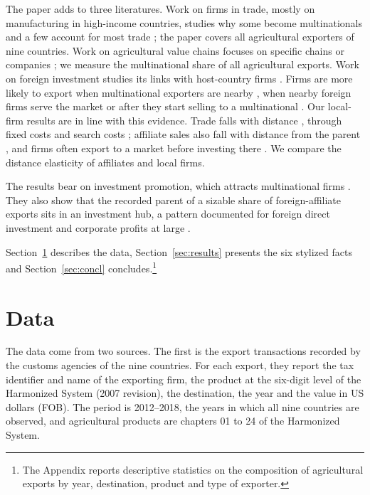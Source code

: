 The paper adds to three literatures. Work on firms in trade, mostly on manufacturing in high-income countries,
studies why some become multinationals and a few account for most trade \citep[see, e.g.,][]{helpman2004,antras2014,bernard2018,ramondo2016}; the paper covers all
agricultural exporters of nine countries. Work on agricultural value chains focuses on specific chains
or companies \citep{swinnen2007,reardon2009,unctad2009,murphy2012,clapp2015}; we measure the multinational share of all agricultural exports. Work on foreign investment studies its links
with host-country firms \citep{javorcik2004,alfarourena2022}. Firms are more likely to export
when multinational exporters are nearby \citep{aitken1997}, when nearby foreign firms serve the market
\citep{mayneris2015} or after they start selling to a multinational \citep{carballo2021}. Our local-firm results are in line with this evidence. Trade falls with distance \citep{head2014}, through fixed costs \citep{chaney2008} and search costs \citep{rauch1999}; affiliate sales also fall with distance from the parent \citep{keller2013}, and firms often export to a market before investing there \citep{conconi2016}. We compare the distance elasticity of affiliates and local firms.

The results bear on investment promotion, which attracts multinational firms \citep{harding2011,volpe2021,carballo2026}. They also show that the recorded parent of a sizable share of foreign-affiliate exports sits in an investment hub, a pattern documented for foreign direct investment and corporate profits at large \citep{damgaard2024,torslov2023}.

Section~\ref{sec:data} describes the data, Section~\ref{sec:results} presents the six stylized facts and
Section~\ref{sec:concl} concludes.\footnote{The Appendix reports descriptive statistics on the composition of agricultural exports by year, destination, product and type of exporter.}

\section{Data}\label{sec:data}
The data come from two sources. The first is the export transactions recorded by the customs agencies of the
nine countries. For each export, they report the tax identifier and name of the exporting firm, the product at the
six-digit level of the Harmonized System (2007 revision), the destination, the year and the value in US dollars
(FOB). The period is 2012--2018, the years in which all nine countries are observed, and agricultural products are
chapters 01 to 24 of the Harmonized System.

